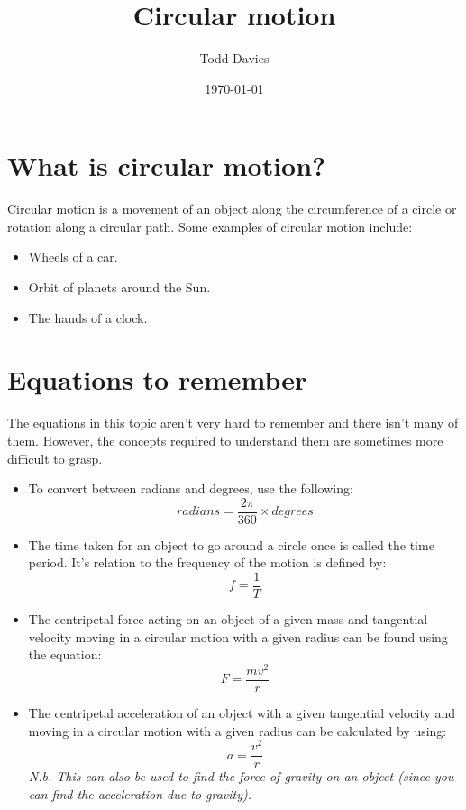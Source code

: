 \documentclass{article}
\title{Circular motion}
\author{Todd Davies}
\date{\today}
\begin{document}
\lhead{\today}

\maketitle

\section*{What is circular motion?}
\thispagestyle{empty}
Circular motion is a movement of an object along the circumference of a circle or rotation along a circular path. Some examples of circular motion include:
\begin{itemize}
	\item Wheels of a car.
	\item Orbit of planets around the Sun.
	\item The hands of a clock.
\end{itemize}

\section*{Equations to remember}
\label{sec:Equations To Remember}
The equations in this topic aren't very hard to remember and there isn't many of them. However, the concepts required to understand them are sometimes more difficult to grasp.

\begin{itemize}
	\item To convert between radians and degrees, use the following:
	\[
		radians = \frac{2\pi}{360} \times degrees
	\]
	\item The time taken for an object to go around a circle once is called the time period. It's relation to the frequency of the motion is defined by:
	\[
		f = \frac{1}{T}
	\]
	\item The centripetal force acting on an object of a given mass and tangential velocity moving in a circular motion with a given radius can be found using the equation:
	\[
		F = \frac{mv^2}{r}
	\]
	\item The centripetal acceleration of an object with a given tangential velocity and moving in a circular motion with a given radius can be calculated by using:
	\[
		a = \frac{v^2}{r}
	\]
	\textit{N.b. This can also be used to find the force of gravity on an object (since you can find the acceleration due to gravity).}
\end{itemize}
\end{document}
